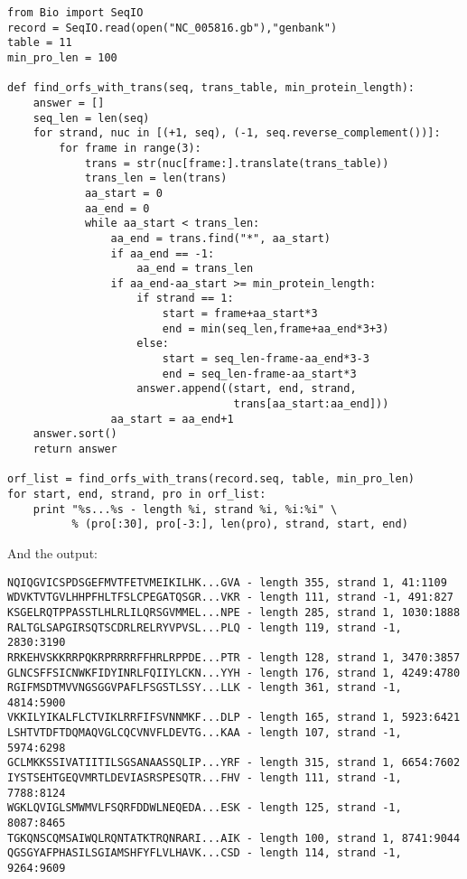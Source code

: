 \documentclass{report}
\begin{document}
\begin{verbatim}
from Bio import SeqIO 
record = SeqIO.read(open("NC_005816.gb"),"genbank")
table = 11
min_pro_len = 100

def find_orfs_with_trans(seq, trans_table, min_protein_length):
    answer = []
    seq_len = len(seq)
    for strand, nuc in [(+1, seq), (-1, seq.reverse_complement())]:
        for frame in range(3):
            trans = str(nuc[frame:].translate(trans_table))
            trans_len = len(trans)
            aa_start = 0
            aa_end = 0
            while aa_start < trans_len:
                aa_end = trans.find("*", aa_start)
                if aa_end == -1:
                    aa_end = trans_len
                if aa_end-aa_start >= min_protein_length:
                    if strand == 1:
                        start = frame+aa_start*3
                        end = min(seq_len,frame+aa_end*3+3)
                    else:
                        start = seq_len-frame-aa_end*3-3
                        end = seq_len-frame-aa_start*3                        
                    answer.append((start, end, strand,
                                   trans[aa_start:aa_end]))
                aa_start = aa_end+1
    answer.sort()
    return answer

orf_list = find_orfs_with_trans(record.seq, table, min_pro_len)
for start, end, strand, pro in orf_list:
    print "%s...%s - length %i, strand %i, %i:%i" \
          % (pro[:30], pro[-3:], len(pro), strand, start, end)
\end{verbatim}

\noindent And the output:

\begin{verbatim}
NQIQGVICSPDSGEFMVTFETVMEIKILHK...GVA - length 355, strand 1, 41:1109
WDVKTVTGVLHHPFHLTFSLCPEGATQSGR...VKR - length 111, strand -1, 491:827
KSGELRQTPPASSTLHLRLILQRSGVMMEL...NPE - length 285, strand 1, 1030:1888
RALTGLSAPGIRSQTSCDRLRELRYVPVSL...PLQ - length 119, strand -1, 2830:3190
RRKEHVSKKRRPQKRPRRRRFFHRLRPPDE...PTR - length 128, strand 1, 3470:3857
GLNCSFFSICNWKFIDYINRLFQIIYLCKN...YYH - length 176, strand 1, 4249:4780
RGIFMSDTMVVNGSGGVPAFLFSGSTLSSY...LLK - length 361, strand -1, 4814:5900
VKKILYIKALFLCTVIKLRRFIFSVNNMKF...DLP - length 165, strand 1, 5923:6421
LSHTVTDFTDQMAQVGLCQCVNVFLDEVTG...KAA - length 107, strand -1, 5974:6298
GCLMKKSSIVATIITILSGSANAASSQLIP...YRF - length 315, strand 1, 6654:7602
IYSTSEHTGEQVMRTLDEVIASRSPESQTR...FHV - length 111, strand -1, 7788:8124
WGKLQVIGLSMWMVLFSQRFDDWLNEQEDA...ESK - length 125, strand -1, 8087:8465
TGKQNSCQMSAIWQLRQNTATKTRQNRARI...AIK - length 100, strand 1, 8741:9044
QGSGYAFPHASILSGIAMSHFYFLVLHAVK...CSD - length 114, strand -1, 9264:9609
\end{verbatim}
\end{document}
